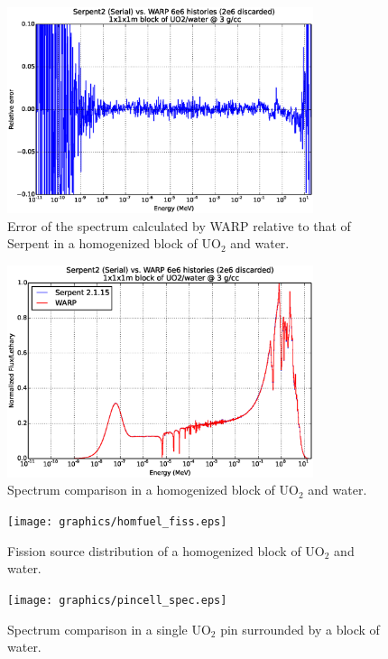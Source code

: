 \begin{figure}[h!] 
\centering
\includegraphics[width=0.8\textwidth]{graphics/homfuel_spec_err.eps}
\caption{Error of the spectrum calculated by WARP relative to that of Serpent in a homogenized block of UO$_2$ and water. \label{homfuel_spec_err} }
\end{figure}

\begin{figure}[h!] 
\centering
\includegraphics[width=0.8\textwidth]{graphics/homfuel_spec.eps}
\caption{Spectrum comparison in a homogenized block of UO$_2$ and water. \label{homfuel_spec} }
\end{figure}

\begin{figure}[h!] 
\centering
\texttt{[image: graphics/homfuel\_fiss.eps]}
\caption{Fission source distribution of a homogenized block of UO$_2$ and water. \label{homfuel_fiss} }
\end{figure}

\begin{figure}[h!] 
\centering
\texttt{[image: graphics/pincell\_spec.eps]}
\caption{Spectrum comparison in a single UO$_2$ pin surrounded by a block of water. \label{pincell_spec} }
\end{figure}

